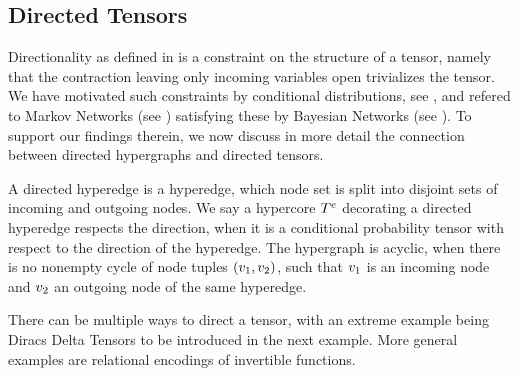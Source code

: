 \subsection{Directed Tensors}

Directionality as defined in  is a constraint on the structure of a tensor, namely that the contraction leaving only incoming variables open trivializes the tensor.
We have motivated such constraints by conditional distributions, see , and refered to Markov Networks (see ) satisfying these by Bayesian Networks (see ).
To support our findings therein, we now discuss in more detail the connection between directed hypergraphs and directed tensors.

\begin{definition}
    A directed hyperedge is a hyperedge, which node set is split into disjoint sets of incoming and outgoing nodes.
    We say a hypercore $T^{e}$ decorating a directed hyperedge respects the direction, when it is a conditional probability tensor with respect to the direction of the hyperedge.
    The hypergraph is acyclic, when there is no nonempty cycle of node tuples $(v_1,v_2)$, such that $v_1$ is an incoming node and $v_2$ an outgoing node of the same hyperedge.
\end{definition}

There can be multiple ways to direct a tensor, with an extreme example being Diracs Delta Tensors to be introduced in the next example.
More general examples are relational encodings of invertible functions.


